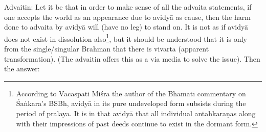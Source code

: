 \vskip 4pt

Advaitin: Let it be that in order to make sense of all the advaita statements, if one accepts the world as an appearance due to avidyā as cause, then the harm done to advaita by avidyā will (have no leg) to stand on. It is not as if avidyā does not exist in dissolution also\footnote{According to Vācaspati Miśra the author of the Bhāmatī commentary on Śaṅkara’s BSBh, avidyā in its pure undeveloped form subsists during the period of pralaya. It is in that avidyā that all individual antahkaraṇas along with their impressions of past deeds continue to exist in the dormant form.}, but it should be understood that it is only from the single/singular Brahman that there is vivarta (apparent transformation). (The advaitin offers this as a via media to solve the issue). Then the answer:

\vskip 4pt


